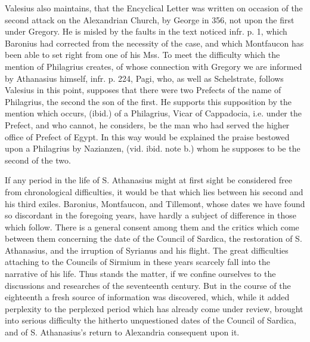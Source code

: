 Valesius also maintains, that
the Encyclical Letter was written on occasion of the second attack on
the Alexandrian Church, by George in 356, not upon the first under
Gregory. He is misled by the faults in the text noticed infr. p. 1,
which Baronius had corrected from the necessity of the case, and which
Montfaucon has been able to set right from one of his Mss. To meet the
difficulty which the mention of Philagrius creates, of whose
connection with Gregory we are informed by Athanasius himself, infr.
p. 224, Pagi, who, as well as Schelstrate, follows Valesius in this
point, supposes that there were two Prefects of the name of Philagrius,
the second the son of the first. He supports this supposition by the
mention which occurs, (ibid.) of a Philagrius, Vicar of Cappadocia,
i.e. under the Prefect, and who cannot, he considers, be the man who
had served the higher office of Prefect of Egypt. In this way would be explained the praise bestowed upon a Philagrius by Nazianzen,
(vid. ibid. note b.) whom he supposes to be the second of the two.


If any period in the life of
S. Athanasius might at first sight be considered free from
chronological difficulties, it would be that which lies between his
second and his third exiles. Baronius, Montfaucon, and Tillemont,
whose dates we have found so discordant in the foregoing years, have
hardly a subject of difference in those which follow. There is a
general consent among them and the critics which come between them
concerning the date of the Council of Sardica, the restoration of S.
Athanasius, and the irruption of Syrianus and his flight. The great
difficulties attaching to the Councils of Sirmium in these years
scarcely fall into the narrative of his life. Thus stands the matter,
if we confine ourselves to the discussions and researches of the
seventeenth century. But in the course of the eighteenth a fresh
source of information was discovered, which, while it added perplexity
to the perplexed period which has already come under review, brought
into serious difficulty the hitherto unquestioned dates of the Council
of Sardica, and of S. Athanasius's return to Alexandria consequent
upon it.

